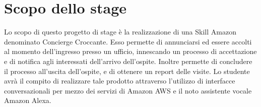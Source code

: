 \section*{Scopo dello stage}
Lo scopo di questo progetto di stage è la realizzazione di una Skill Amazon denominato Concierge Croccante. Esso permette di annunciarsi ed essere accolti al momento dell'ingresso presso un ufficio, innescando un processo di accettazione e di notifica agli interessati dell'arrivo dell'ospite. Inoltre permette di concludere il processo all'uscita dell'ospite, e di ottenere un report delle visite.
Lo studente avrà il compito di realizzare tale prodotto attraverso l'utilizzo di interfacce conversazionali per mezzo dei servizi di Amazon AWS e il noto assistente vocale Amazon Alexa.

